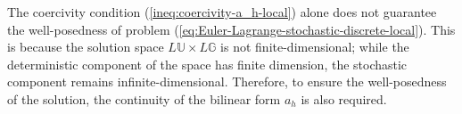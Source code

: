 \documentclass[final,onefignum,onetabnum]{mousaviart}
\begin{document}
	\vspace*{1mm}
		The coercivity condition (\ref{ineq:coercivity-a_h-local}) alone does not guarantee the well-posedness of problem (\ref{eq:Euler-Lagrange-stochastic-discrete-local}). This is because the solution space $ L \mathbb{U} \times L \mathbb{G}$ is not finite-dimensional; while the deterministic component of the space has finite dimension, the stochastic component remains infinite-dimensional. Therefore, to ensure the well-posedness of the solution, the continuity of the bilinear form $a_h$ is also required.
		
\end{document}
